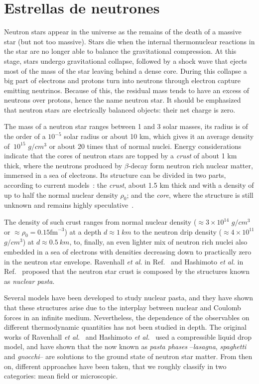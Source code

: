 \section{Estrellas de neutrones}\label{sc:intro}
Neutron stars appear in the universe as the remains of the death of a
massive star (but not too massive). Stars die when the internal
thermonuclear reactions in the star are no longer able to balance the
gravitational compression. At this stage, stars undergo gravitational
collapse, followed by a shock wave that ejects most of the mass of the
star leaving behind a dense core. During this collapse a big part of
electrons and protons turn into neutrons through electron capture
emitting neutrinos. Because of this, the residual mass tends to have
an excess of neutrons over protons, hence the name neutron star. It
should be emphasized that neutron stars are electrically balanced
objects: their net charge is zero.

The mass of a neutron star ranges between 1 and 3 solar masses, its
radius is of the order of a $10^{-5}$ solar radius or about 10 km,
which gives it an average density of $~10^{15}$ $g/cm^3$ or about 20
times that of normal nuclei. Energy considerations indicate that the
cores of neutron stars are topped by a \emph{crust} of about 1 km
thick, where the neutrons produced by $\beta$-decay form neutron rich
nuclear matter, immersed in a sea of electrons. Its structure can be
divided in two parts, according to current
models~\cite{page_minimal_2004, geppert_temperature_2004}: the
\emph{crust}, about 1.5 km thick and with a density of up to half the
normal nuclear density $\rho_0$; and the \emph{core}, where the
structure is still unknown and remains highly
speculative~\cite{woosley_physics_2005}.

The density of such crust ranges from normal nuclear density ($\approx
3\times10^{14}$ $g/cm^3$ or $\approx \rho_0=0.15 \text{fm}^{-3}$) at a
depth $d \approx 1 \ km$ to the neutron drip density ($\approx
4\times10^{11}$ $g/cm^3$) at $d \approx 0.5 \ km$, to, finally, an
even lighter mix of neutron rich nuclei also embedded in a sea of
electrons with densities decreasing down to practically zero in the
neutron star envelope.  Ravenhall \emph{et al.}  in
Ref.~\cite{ravenhall_structure_1983} and Hashimoto \emph{et al.} in
Ref.~\cite{hashimoto_shape_1984} proposed that the neutron star crust
is composed by the structures known as \emph{nuclear pasta}.

Several models have been developed to study nuclear pasta, and they
have shown that these structures arise due to the interplay between
nuclear and Coulomb forces in an infinite medium. Nevertheless, the
dependence of the observables on different thermodynamic quantities
has not been studied in depth. The original works of Ravenhall
\emph{et al.}~\cite{ravenhall_structure_1983} and Hashimoto \emph{et
  al.}~\cite{hashimoto_shape_1984} used a compressible liquid drop
model, and have shown that the now known as \emph{pasta phases}
--\emph{lasagna}, \emph{spaghetti} and \emph{gnocchi}-- are solutions
to the ground state of neutron star matter. From then on, different
approaches have been taken, that we roughly classify in two
categories: mean field or microscopic.

